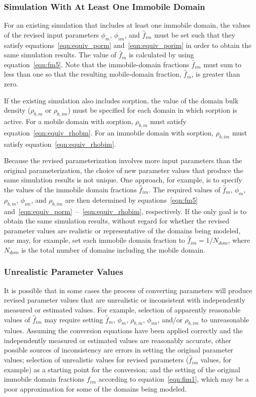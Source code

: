 \subsubsection{Simulation With At Least One Immobile Domain}

For an existing simulation that includes at least one immobile domain, the values of the revised input parameters $\phi_{m}$, $\phi_{im}$, and $\hat{f}_{im}$ must be set such that they satisfy equations~\ref{eqn:equiv_porm} and~\ref{eqn:equiv_porim} in order to obtain the same simulation results. The value of $\hat{f}_{m}$ is calculated by \mf using equation~\ref{eqn:fm5}. Note that the immobile-domain fractions $\hat{f}_{im}$ must sum to less than one so that the resulting mobile-domain fraction, $\hat{f}_{m}$, is greater than zero.

If the existing simulation also includes sorption, the value of the domain bulk density ($\rho_{b, m}$ or $\rho_{b, im}$) must be specified for each domain in which sorption is active. For a mobile domain with sorption, $\rho_{b, m}$ must satisfy equation~\ref{eqn:equiv_rhobm}. For an immobile domain with sorption, $\rho_{b, im}$ must satisfy equation~\ref{eqn:equiv_rhobim}.

Because the revised parameterization involves more input parameters than the original parameterization, the choice of new parameter values that produce the same simulation results is not unique. One approach, for example, is to specify the values of the immobile domain fractions $\hat{f}_{im}$. The required values of $\hat{f}_{m}$, $\phi_{m}$, $\rho_{b, m}$, $\phi_{im}$, and $\rho_{b, im}$ are then determined by equations~\ref{eqn:fm5} and~\ref{eqn:equiv_porm}~--~\ref{eqn:equiv_rhobim}, respectively. If the only goal is to obtain the same simulation results, without regard for whether the revised parameter values are realistic or representative of the domains being modeled, one may, for example, set each immobile domain fraction to $\hat{f}_{im} = 1 / N_{dom}$, where $N_{dom}$ is the total number of domains including the mobile domain.

\subsubsection{Unrealistic Parameter Values}

It is possible that in some cases the process of converting parameters will produce revised parameter values that are unrealistic or inconsistent with independently measured or estimated values. For example, selection of apparently reasonable values of $\hat{f}_{im}$ may require setting $\hat{f}_{m}$, $\phi_{m}$, $\rho_{b, m}$, $\phi_{im}$, and/or $\rho_{b, im}$ to unreasonable values. Assuming the conversion equations have been applied correctly and the independently measured or estimated values are reasonably accurate, other possible sources of inconsistency are errors in setting the original parameter values; selection of unrealistic values for revised parameters ($\hat{f}_{im}$ values, for example) as a starting point for the conversion; and the setting of the original immobile domain fractions $f_{im}$ according to equation~\ref{eqn:fim1}, which may be a poor approximation for some of the domains being modeled.
